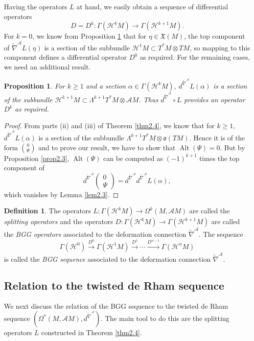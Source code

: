 \documentclass[12pt,a4paper]{amsart}
\def\frak{\mathfrak}
\def\Cal{\mathcal}
\renewcommand{\o}{\circ}
\newcommand{\al}{\alpha}
\newcommand{\Ga}{\Gamma}
\newcommand{\La}{\Lambda}
\newcommand{\Om}{\Omega}
\newcommand{\Alt}{\operatorname{Alt}}
\newcommand{\tn}{\widetilde{\nabla}}
\newcounter{theorem}
\numberwithin{theorem}{section}
\numberwithin{equation}{section}
\newtheorem{prop}[theorem]{Proposition}
\theoremstyle{definition}
\newtheorem{definition}[theorem]{Definition}
\theoremstyle{remark}
\begin{document}
Having the operators $L$ at hand, we easily obtain a sequence of differential
operators 
$$D=D^k:\Ga(\Cal H^kM)\to\Ga(\Cal H^{k+1}M).$$ For $k=0$, we know from Proposition
\ref{prop2.4} that for $\eta\in\frak X(M)$, the top component of $\tn^{\Cal
  A}L(\eta)$ is a section of the subbundle $\Cal H^1M\subset T^*M\otimes TM$, so
mapping to this component defines a differential operator $D^0$ as required. For the
remaining cases, we need an additional result.

\begin{prop}\label{prop2.4}
  For $k\geq 1$ and a section $\al\in\Ga(\Cal H^kM)$, $d^{\tn^{\Cal A}}L(\al)$ is a
  section of the subbundle $\Cal H^{k+1}M\subset\La^{k+1}T^*M\otimes\Cal AM$. Thus
  $d^{\tn^{\Cal A}}\o L$ provides an operator $D^k$ as required.
\end{prop}
\begin{proof}
  From parts (ii) and (iii) of Theorem \ref{thm2.4}, we know that for $k\geq 1$,
  $d^{\tn^{\Cal A}}L(\al)$ is a section of the subbundle $\La^{k+1}T^*M\otimes\frak
  o(TM)$. Hence it is of the form $\binom{0}{\Psi}$ and to prove our result, we have
  to show that $\Alt(\Psi)=0$. But by Proposition \ref{prop2.3}, $\Alt(\Psi)$ can be
  computed as $(-1)^{k+1}$ times the top component of
  $$
   d^{\tn^{\Cal A}}\begin{pmatrix} 0\\ \Psi\end{pmatrix}=  d^{\tn^{\Cal
       A}}d^{\tn^{\Cal A}}L(\al), 
   $$
   which vanishes by Lemma \ref{lem2.3}.
 \end{proof}

 \begin{definition}\label{def2.4}
   The operators $L:\Ga(\Cal H^kM)\to\Om^k(M,\Cal AM)$ are called the
   \textit{splitting operators} and the operators
   $D:\Ga(\Cal H^kM)\to\Ga(\Cal H^{k+1}M)$ are called the \textit{BGG operators}
   associated to the deformation connection $\tn^{\Cal A}$. The sequence
   $$
  \Ga(\Cal H^0)\overset{D^0}{\longrightarrow}\Ga(\Cal
  H^1M)\overset{D^1}{\longrightarrow}\cdots
  \overset{D^{n-1}}{\longrightarrow}\Ga(\Cal H^nM)
  $$
  is called the \textit{BGG sequence} associated to the deformation connection
  $\tn^{\Cal A}$. 
 \end{definition}

 \subsection{Relation to the twisted de Rham sequence}\label{2.5}
 We next discuss the relation of the BGG sequence to the twisted de Rham sequence
 $(\Om^*(M,\Cal AM),d^{\tn^{\Cal A}})$. The main tool to do this are the splitting
 operators $L$ constructed in Theorem \ref{thm2.4}.
\end{document}
